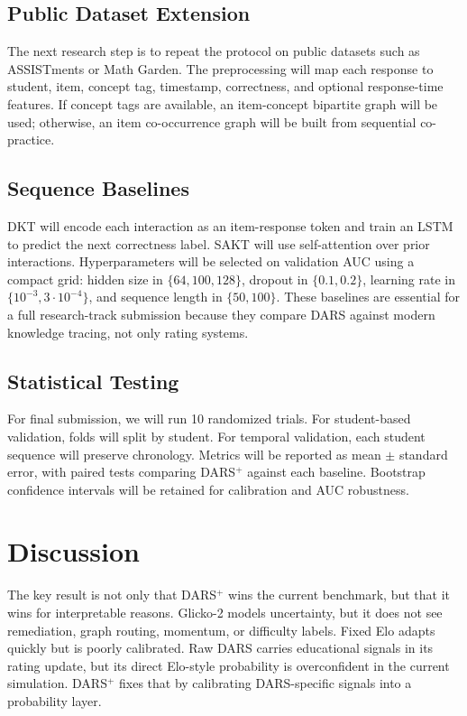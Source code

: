 \documentclass[sigconf,nonacm]{acmart}
\begin{document}
\subsection{Public Dataset Extension}
The next research step is to repeat the protocol on public datasets such as ASSISTments or Math Garden. The preprocessing will map each response to student, item, concept tag, timestamp, correctness, and optional response-time features. If concept tags are available, an item-concept bipartite graph will be used; otherwise, an item co-occurrence graph will be built from sequential co-practice.

\subsection{Sequence Baselines}
DKT will encode each interaction as an item-response token and train an LSTM to predict the next correctness label. SAKT will use self-attention over prior interactions. Hyperparameters will be selected on validation AUC using a compact grid: hidden size in $\{64,100,128\}$, dropout in $\{0.1,0.2\}$, learning rate in $\{10^{-3},3\cdot10^{-4}\}$, and sequence length in $\{50,100\}$. These baselines are essential for a full research-track submission because they compare DARS against modern knowledge tracing, not only rating systems.

\subsection{Statistical Testing}
For final submission, we will run 10 randomized trials. For student-based validation, folds will split by student. For temporal validation, each student sequence will preserve chronology. Metrics will be reported as mean $\pm$ standard error, with paired tests comparing DARS$^+$ against each baseline. Bootstrap confidence intervals will be retained for calibration and AUC robustness.

\section{Discussion}
The key result is not only that DARS$^+$ wins the current benchmark, but that it wins for interpretable reasons. Glicko-2 models uncertainty, but it does not see remediation, graph routing, momentum, or difficulty labels. Fixed Elo adapts quickly but is poorly calibrated. Raw DARS carries educational signals in its rating update, but its direct Elo-style probability is overconfident in the current simulation. DARS$^+$ fixes that by calibrating DARS-specific signals into a probability layer.
\end{document}
